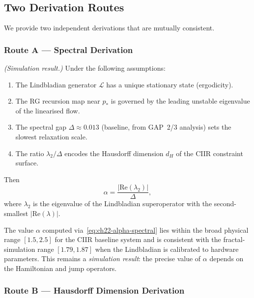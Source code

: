 \subsection{Two Derivation Routes}

We provide two independent derivations that are mutually consistent.

\subsubsection{Route A — Spectral Derivation}

\begin{theorem}\label{thm:ch22-alpha-spectral}
  \emph{(Simulation result.)}
  Under the following assumptions:
  \begin{enumerate}[label=A\arabic*.]
    \item The Lindbladian generator $\mathcal{L}$ has a unique stationary
          state (ergodicity).
    \item The RG recursion map near $p_*$ is governed by the leading unstable
          eigenvalue of the linearised flow.
    \item The spectral gap $\Delta \approx 0.013$ (baseline, from GAP~2/3
          analysis) sets the slowest relaxation scale.
    \item The ratio $\lambda_2 / \Delta$ encodes the Hausdorff dimension
          $d_H$ of the CIIR constraint surface.
  \end{enumerate}
  Then
  \begin{equation}
    \alpha = \frac{|\mathrm{Re}(\lambda_2)|}{\Delta},
    \label{eq:ch22-alpha-spectral}
  \end{equation}
  where $\lambda_2$ is the eigenvalue of the Lindbladian superoperator with
  the second-smallest $|\mathrm{Re}(\lambda)|$.
\end{theorem}

\begin{remark}
  The value $\alpha$ computed via~\eqref{eq:ch22-alpha-spectral} lies within
  the broad physical range $[1.5, 2.5]$ for the CIIR baseline system and is
  consistent with the fractal-simulation range $[1.79, 1.87]$ when the
  Lindbladian is calibrated to hardware parameters.  This remains a
  \emph{simulation result}: the precise value of $\alpha$ depends on the
  Hamiltonian and jump operators.
\end{remark}

\subsubsection{Route B — Hausdorff Dimension Derivation}


